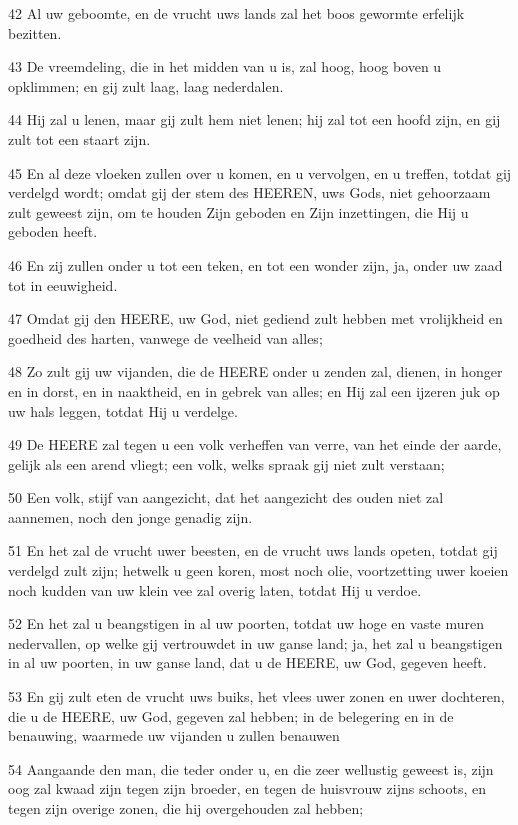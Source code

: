 \par 42 Al uw geboomte, en de vrucht uws lands zal het boos gewormte erfelijk bezitten.
\par 43 De vreemdeling, die in het midden van u is, zal hoog, hoog boven u opklimmen; en gij zult laag, laag nederdalen.
\par 44 Hij zal u lenen, maar gij zult hem niet lenen; hij zal tot een hoofd zijn, en gij zult tot een staart zijn.
\par 45 En al deze vloeken zullen over u komen, en u vervolgen, en u treffen, totdat gij verdelgd wordt; omdat gij der stem des HEEREN, uws Gods, niet gehoorzaam zult geweest zijn, om te houden Zijn geboden en Zijn inzettingen, die Hij u geboden heeft.
\par 46 En zij zullen onder u tot een teken, en tot een wonder zijn, ja, onder uw zaad tot in eeuwigheid.
\par 47 Omdat gij den HEERE, uw God, niet gediend zult hebben met vrolijkheid en goedheid des harten, vanwege de veelheid van alles;
\par 48 Zo zult gij uw vijanden, die de HEERE onder u zenden zal, dienen, in honger en in dorst, en in naaktheid, en in gebrek van alles; en Hij zal een ijzeren juk op uw hals leggen, totdat Hij u verdelge.
\par 49 De HEERE zal tegen u een volk verheffen van verre, van het einde der aarde, gelijk als een arend vliegt; een volk, welks spraak gij niet zult verstaan;
\par 50 Een volk, stijf van aangezicht, dat het aangezicht des ouden niet zal aannemen, noch den jonge genadig zijn.
\par 51 En het zal de vrucht uwer beesten, en de vrucht uws lands opeten, totdat gij verdelgd zult zijn; hetwelk u geen koren, most noch olie, voortzetting uwer koeien noch kudden van uw klein vee zal overig laten, totdat Hij u verdoe.
\par 52 En het zal u beangstigen in al uw poorten, totdat uw hoge en vaste muren nedervallen, op welke gij vertrouwdet in uw ganse land; ja, het zal u beangstigen in al uw poorten, in uw ganse land, dat u de HEERE, uw God, gegeven heeft.
\par 53 En gij zult eten de vrucht uws buiks, het vlees uwer zonen en uwer dochteren, die u de HEERE, uw God, gegeven zal hebben; in de belegering en in de benauwing, waarmede uw vijanden u zullen benauwen
\par 54 Aangaande den man, die teder onder u, en die zeer wellustig geweest is, zijn oog zal kwaad zijn tegen zijn broeder, en tegen de huisvrouw zijns schoots, en tegen zijn overige zonen, die hij overgehouden zal hebben;
